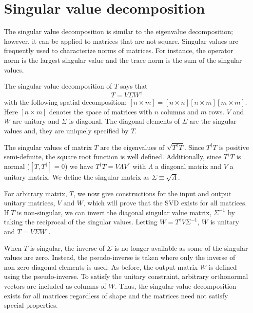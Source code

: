 \documentclass[11pt,oneside,final]{huthesis}%
\begin{document}
\chapter{Singular value decomposition}\label{appx:SVD}

The singular value decomposition is similar to the eigenvalue decomposition; however, it can be applied to matrices that are not square.  Singular values are frequently used to characterize norms of matrices. For instance, the operator norm is the largest singular value and the trace norm is the sum of the singular values.  

The singular value decomposition of $T$ says that  \begin{equation}T=V\Sigma W^\dagger\end{equation}  with the following spatial decomposition: $[ n\times m ]=[ n\times n ][ n\times m ][ m\times m ]$. Here $[ n\times m ]$ denotes the space of matrices with $n$ columns and $m$ rows. $V$ and $W$ are unitary and $\Sigma$ is diagonal.  The diagonal elements of $\Sigma$ are the singular values and, they are uniquely specified by $T$.

The singular values of matrix $T$ are the eigenvalues of $\sqrt{T^\dagger T}$.  Since $T^\dagger T$ is positive semi-definite, the square root function is well defined.  Additionally, since $T^\dagger T$ is normal ($[T,T^\dag]=0$) we have $T^\dagger T=V\Lambda V^\dagger$ with $\Lambda$ a diagonal matrix and $V$ a unitary matrix.  We define the singular matrix as $\Sigma\equiv\sqrt{\Lambda}$.

For arbitrary matrix, $T$, we now give constructions for the input and output unitary matrices, $V$ and $W$, which will prove that the SVD exists for all matrices. If $T$ is non-singular, we can invert the diagonal singular value matrix,  $\Sigma^{-1}$ by taking the reciprocal of the singular values.  Letting $W= T^\dagger V\Sigma^{-1}$, $W$ is unitary and  $T=V\Sigma W^\dagger$. 

When $T$ is singular, the inverse of $\Sigma$ is no longer available as some of the singular values are zero. Instead, the pseudo-inverse is taken where only the inverse of non-zero diagonal elements is used.  As before, the output matrix $W$ is defined using the pseudo-inverse.  To satisfy the unitary constraint, arbitrary orthonormal vectors are included as columns of $W$.  Thus, the singular value decomposition exists for all matrices regardless of shape and the matrices need not satisfy special properties. 
\end{document}
